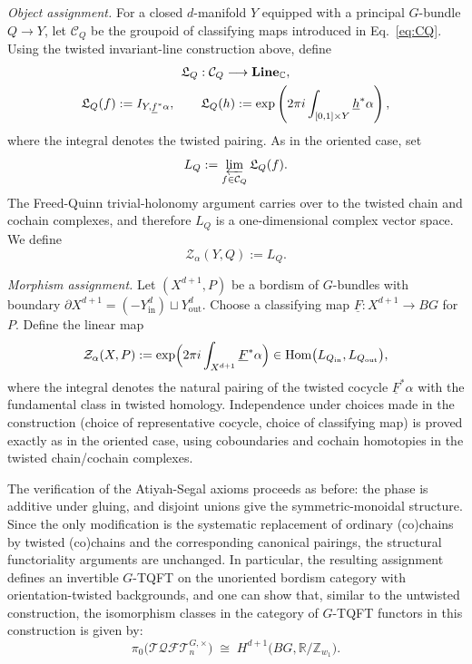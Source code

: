 \documentclass[aps,prx,reprint,superscriptaddress,twocolumn,amsmath,amssymb,amsfonts, nofootinbib]{revtex4-2}
\newcommand{\Line}{{\bf Line}_{\mathbb{C}}}
\newcommand{\tqft}{\mathcal{TQFT}_{n}}
\theoremstyle{apsstyle}
\begin{document}
\noindent\textit{Object assignment.}
For a closed $d$-manifold $Y$ equipped with a principal $G$-bundle
$Q\to Y$, let $\mathcal C_Q$ be the groupoid of classifying maps
introduced in Eq.~\eqref{eq:CQ}. Using the twisted invariant-line
construction above, define
\begin{gather*}
    \mathfrak L_Q:\mathcal C_Q\longrightarrow\Line,\\
    \mathfrak L_Q(f)
    :=
    I_{Y,\underline f^*\alpha},
    \qquad
    \mathfrak L_Q(h)
    :=
    \exp\left(
        2\pi i
        \int_{[0,1]\times Y}\underline h^*\alpha
    \right),
\end{gather*}
where the integral denotes the twisted pairing. As in the oriented
case, set
\begin{equation*}
    L_Q
    :=
    \varprojlim_{f\in\mathcal C_Q}\mathfrak L_Q(f).
\end{equation*}
The Freed-Quinn trivial-holonomy argument carries over to the
twisted chain and cochain complexes, and therefore $L_Q$ is a
one-dimensional complex vector space. We define
\begin{equation*}
    \mathcal Z_\alpha(Y,Q):=L_Q.
\end{equation*}

\bigskip

\noindent\textit{Morphism assignment.}
Let $(X^{d+1},P)$ be a bordism of $G$-bundles with boundary
$\partial X^{d+1} = (-Y^{d}_{\mathrm{in}})\sqcup Y^{d}_{\mathrm{out}}$.
Choose a classifying map $\underline F:X^{d+1}\to BG$ for $P$. Define the linear map
\begin{equation*}
\mathcal Z_{\alpha}(X,P) := \exp\Bigl(2\pi i \int_{X^{d+1}}\underline F^{*}\alpha\Bigr) \in
\mathrm{Hom}\bigl(L_{Q_{\mathrm{in}}},L_{Q_{\mathrm{out}}}\bigr),
\end{equation*}
where the integral denotes the natural pairing of the twisted cocycle $\underline F^{*}\alpha$ with the fundamental class in twisted homology. Independence under choices made in the construction (choice of representative cocycle, choice of classifying map) is proved exactly as in the oriented case, using coboundaries and cochain homotopies in the twisted chain/cochain complexes.

\bigskip

The verification of the Atiyah-Segal axioms proceeds as before: the phase is additive under gluing, and disjoint unions give the symmetric-monoidal structure. Since the only modification is the systematic replacement of ordinary (co)chains by twisted (co)chains and the corresponding canonical pairings, the structural functoriality arguments are unchanged. In particular, the resulting assignment defines an invertible $G$-TQFT on the unoriented bordism category with orientation-twisted backgrounds, and one can show that, similar to the untwisted construction, the isomorphism classes in the category of $G$-TQFT functors in this construction is given by:
\begin{equation}
\label{eq:coh-classification2}
   \pi_{0}\bigl(\tqft^{G,\times}\bigr)
   \;\cong\;
   H^{d+1}\bigl(BG,\mathbb R/\mathbb Z_{w_{1}}\bigr).
\end{equation}
\end{document}
